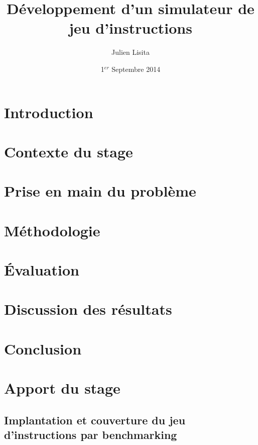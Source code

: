 \documentclass[a4paper,11pt]{article}
\begin{document}
\setlength{\parskip}{0.5em}%
\baselineskip 14pt


\title{\bf \huge Développement d'un simulateur de jeu d'instructions}
\author{Julien Lisita}
\date{1$^{er}$ Septembre 2014}

\maketitle

\newpage



\tableofcontents {}
\listoffigures


\section{Introduction}
\label{introduction}

\section{Contexte du stage}
\section{Prise en main du problème}
\section{Méthodologie}
\section{Évaluation}
\section{Discussion des résultats}
\section{Conclusion}
\section{Apport du stage}

\begin{appendix}
\section{Implantation et couverture du jeu d'instructions par benchmarking}
 
\end{appendix}



\end{document}
